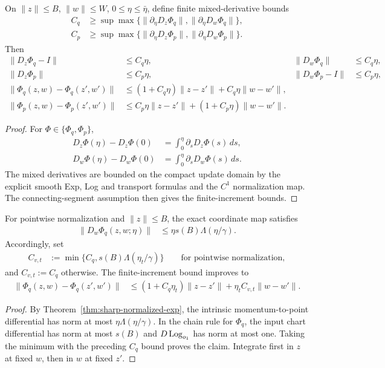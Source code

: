 \begin{lemma}
\label{lem:rigid-step-jacobian}
On $\|z\|\le B$, $\|w\|\le W$, $0\le\eta\le\bar\eta$, define finite mixed-derivative bounds
\begin{align}
 C_q&\ge\sup\max\{\|\partial_\eta D_z\Phi_q\|,\|\partial_\eta D_w\Phi_q\|\},\\
 C_p&\ge\sup\max\{\|\partial_\eta D_z\Phi_p\|,\|\partial_\eta D_w\Phi_p\|\}.
\end{align}
Then
\begin{align}
 \|D_z\Phi_q-I\|&\le C_q\eta,&\|D_w\Phi_q\|&\le C_q\eta,\\
 \|D_z\Phi_p\|&\le C_p\eta,&\|D_w\Phi_p-I\|&\le C_p\eta,\\
 \|\Phi_q(z,w)-\Phi_q(z',w')\|
 &\le(1+C_q\eta)\|z-z'\|+C_q\eta\|w-w'\|,\\
 \|\Phi_p(z,w)-\Phi_p(z',w')\|
 &\le C_p\eta\|z-z'\|+(1+C_p\eta)\|w-w'\|.
\end{align}
\end{lemma}
\begin{proof}
For $\Phi\in\{\Phi_q,\Phi_p\}$,
\begin{align}
 D_z\Phi(\eta)-D_z\Phi(0)&=\int_0^\eta\partial_sD_z\Phi(s)\,ds,\\
 D_w\Phi(\eta)-D_w\Phi(0)&=\int_0^\eta\partial_sD_w\Phi(s)\,ds.
\end{align}
The mixed derivatives are bounded on the compact update domain by the explicit smooth Exp, Log and transport formulas and the $C^1$ normalization map. The connecting-segment assumption then gives the finite-increment bounds.
\end{proof}

\begin{lemma}
\label{lem:sharp-chart-velocity}
For pointwise normalization and $\|z\|\le B$, the exact coordinate map satisfies
\begin{align}
 \|D_w\Phi_q(z,w;\eta)\|
 &\le\eta s(B)\Lambda(\eta/\gamma).
\end{align}
Accordingly, set
\begin{align}
 C_{v,t}&:=\min\{C_q,s(B)\Lambda(\eta_t/\gamma)\}
 \qquad\text{for pointwise normalization},
\end{align}
and $C_{v,t}:=C_q$ otherwise. The finite-increment bound improves to
\begin{align}
 \|\Phi_q(z,w)-\Phi_q(z',w')\|
 &\le(1+C_q\eta_t)\|z-z'\|+\eta_tC_{v,t}\|w-w'\|.
\end{align}
\end{lemma}
\begin{proof}
By Theorem~\ref{thm:sharp-normalized-exp}, the intrinsic momentum-to-point differential has norm at most $\eta\Lambda(\eta/\gamma)$. In the chain rule for $\Phi_q$, the input chart differential has norm at most $s(B)$ and $D\operatorname{Log}_{o_1}$ has norm at most one. Taking the minimum with the preceding $C_q$ bound proves the claim. Integrate first in $z$ at fixed $w$, then in $w$ at fixed $z'$.
\end{proof}

